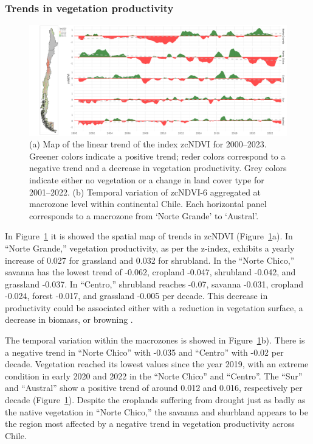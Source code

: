\documentclass[
  authoryear,
  preprint,
  3p,
  onecolumn]{elsarticle}
\begin{document}
\hypertarget{trends-in-vegetation-productivity}{%
\subsubsection{Trends in vegetation
productivity}\label{trends-in-vegetation-productivity}}

\begin{figure}[!ht]

{\centering \includegraphics{../output/figs/temporal_variation_zcNDVI6_macrozonas_con_mapa.png}

}

\caption{\label{fig-zcNDVI_var}(a) Map of the linear trend of the index
zcNDVI for 2000--2023. Greener colors indicate a positive trend; reder
colors correspond to a negative trend and a decrease in vegetation
productivity. Grey colors indicate either no vegetation or a change in
land cover type for 2001--2022. (b) Temporal variation of zcNDVI-6
aggregated at macrozone level within continental Chile. Each horizontal
panel corresponds to a macrozone from `Norte Grande' to `Austral'.}

\end{figure}

In Figure~\ref{fig-zcNDVI_var} it is showed the spatial map of trends in
zcNDVI (Figure~\ref{fig-zcNDVI_var}a). In ``Norte Grande,'' vegetation
productivity, as per the z-index, exhibits a yearly increase of 0.027
for grassland and 0.032 for shrubland. In the ``Norte Chico,'' savanna
has the lowest trend of -0.062, cropland -0.047, shrubland -0.042, and
grassland -0.037. In ``Centro,'' shrubland reaches -0.07, savanna
-0.031, cropland -0.024, forest -0.017, and grassland -0.005 per decade.
This decrease in productivity could be associated either with a
reduction in vegetation surface, a decrease in biomass, or browning
\citep{Miranda2023}.

The temporal variation within the macrozones is showed in
Figure~\ref{fig-zcNDVI_var}b). There is a negative trend in ``Norte
Chico'' with -0.035 and ``Centro'' with -0.02 per decade. Vegetation
reached its lowest values since the year 2019, with an extreme condition
in early 2020 and 2022 in the ``Norte Chico'' and ``Centro''. The
``Sur'' and ``Austral'' show a positive trend of around 0.012 and 0.016,
respectively per decade (Figure~\ref{fig-zcNDVI_var}). Despite the
croplands suffering from drought just as badly as the native vegetation
in ``Norte Chico,'' the savanna and shurbland appears to be the region
most affected by a negative trend in vegetation productivity across
Chile.
\end{document}
